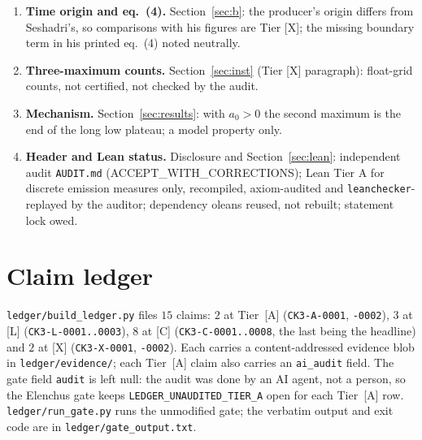 \documentclass[10pt]{article}
\newcommand{\tier}[1]{\textsf{[#1]}}
\newcommand{\tA}{\tier{A}}
\newcommand{\tL}{\tier{L}}
\newcommand{\tC}{\tier{C}}
\newcommand{\tX}{\tier{X}}
\theoremstyle{plain}
\begin{document}
\begin{enumerate}
\item \textbf{Time origin and eq.~(4).} Section~\ref{sec:b}: the producer's origin differs from Seshadri's, so comparisons with his figures are Tier \tX{}; the missing boundary term in his printed eq.~(4) noted neutrally.
\item \textbf{Three-maximum counts.} Section~\ref{sec:inst} (Tier \tX{} paragraph): float-grid counts, not certified, not checked by the audit.
\item \textbf{Mechanism.} Section~\ref{sec:results}: with $a_0>0$ the second maximum is the end of the long low plateau; a model property only.
\item \textbf{Header and Lean status.} Disclosure and Section~\ref{sec:lean}: independent audit \texttt{AUDIT.md} (ACCEPT\_WITH\_CORRECTIONS); Lean Tier A for discrete emission measures only, recompiled, axiom-audited and \texttt{leanchecker}-replayed by the auditor; dependency oleans reused, not rebuilt; statement lock owed.
\end{enumerate}

\section{Claim ledger}\label{sec:ledger}
\texttt{ledger/build\_ledger.py} files $15$ claims: $2$ at Tier~\tA{} (\texttt{CK3-A-0001}, \texttt{-0002}), $3$ at \tL{} (\texttt{CK3-L-0001..0003}), $8$ at \tC{} (\texttt{CK3-C-0001..0008}, the last being the headline) and $2$ at \tX{} (\texttt{CK3-X-0001}, \texttt{-0002}). Each carries a content-addressed evidence blob in \texttt{ledger/evidence/}; each Tier~\tA{} claim also carries an \texttt{ai\_audit} field. The gate field \texttt{audit} is left null: the audit was done by an AI agent, not a person, so the Elenchus gate keeps \texttt{LEDGER\_UNAUDITED\_TIER\_A} open for each Tier~\tA{} row. \texttt{ledger/run\_gate.py} runs the unmodified gate; the verbatim output and exit code are in \texttt{ledger/gate\_output.txt}.

\end{document}
